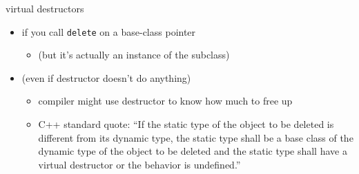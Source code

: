 \begin{frame}{virtual destructors}
    \begin{itemize}
    \item {} if you call \texttt{delete} on a base-class pointer
        \begin{itemize}
        \item (but it's actually an instance of the subclass)
        \end{itemize}
    \item (even if destructor doesn't do anything)
        \begin{itemize}
            \item compiler might use destructor to know how much to free up
            \item C++ standard quote: ``If the static type of the object to be deleted is different from its
dynamic type, the static type shall be a base class of the dynamic type of the object to be deleted and the
static type shall have a virtual destructor or the behavior is undefined.''
        \end{itemize}
    \end{itemize}
\end{frame}
